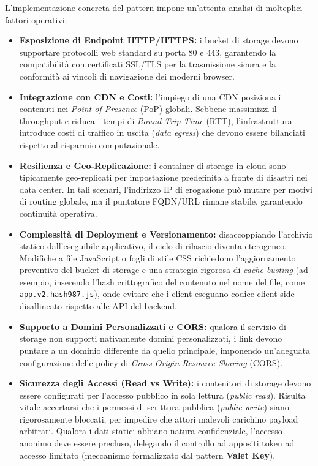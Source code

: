 \documentclass[11pt, a4paper]{article}
\begin{document}
L'implementazione concreta del pattern impone un'attenta analisi di molteplici fattori operativi:
\begin{itemize}[noitemsep]
    \item \textbf{Esposizione di Endpoint HTTP/HTTPS:} i bucket di storage devono supportare protocolli web standard su porta 80 e 443, garantendo la compatibilità con certificati SSL/TLS per la trasmissione sicura e la conformità ai vincoli di navigazione dei moderni browser.
    \item \textbf{Integrazione con CDN e Costi:} l'impiego di una CDN posiziona i contenuti nei \emph{Point of Presence} (PoP) globali. Sebbene massimizzi il throughput e riduca i tempi di \emph{Round-Trip Time} (RTT), l'infrastruttura introduce costi di traffico in uscita (\emph{data egress}) che devono essere bilanciati rispetto al risparmio computazionale.
    \item \textbf{Resilienza e Geo-Replicazione:} i container di storage in cloud sono tipicamente geo-replicati per impostazione predefinita a fronte di disastri nei data center. In tali scenari, l'indirizzo IP di erogazione può mutare per motivi di routing globale, ma il puntatore FQDN/URL rimane stabile, garantendo continuità operativa.
    \item \textbf{Complessità di Deployment e Versionamento:} disaccoppiando l'archivio statico dall'eseguibile applicativo, il ciclo di rilascio diventa eterogeneo. Modifiche a file JavaScript o fogli di stile CSS richiedono l'aggiornamento preventivo del bucket di storage e una strategia rigorosa di \emph{cache busting} (ad esempio, inserendo l'hash crittografico del contenuto nel nome del file, come \texttt{app.v2.hash987.js}), onde evitare che i client eseguano codice client-side disallineato rispetto alle API del backend.
    \item \textbf{Supporto a Domini Personalizzati e CORS:} qualora il servizio di storage non supporti nativamente domini personalizzati, i link devono puntare a un dominio differente da quello principale, imponendo un'adeguata configurazione delle policy di \emph{Cross-Origin Resource Sharing} (CORS).
    \item \textbf{Sicurezza degli Accessi (Read vs Write):} i contenitori di storage devono essere configurati per l'accesso pubblico in sola lettura (\emph{public read}). Risulta vitale accertarsi che i permessi di scrittura pubblica (\emph{public write}) siano rigorosamente bloccati, per impedire che attori malevoli carichino payload arbitrari. Qualora i dati statici abbiano natura confidenziale, l'accesso anonimo deve essere precluso, delegando il controllo ad appositi token ad accesso limitato (meccanismo formalizzato dal pattern \textbf{Valet Key}).
\end{itemize}
\end{document}
